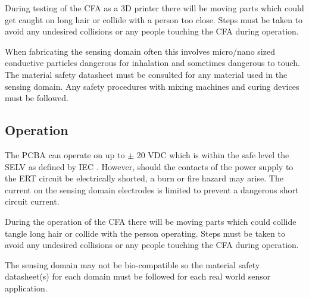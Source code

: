 During testing of the CFA as a 3D printer there will be moving parts which could get caught on long hair or collide with a person too close. Steps must be taken to avoid any undesired collisions or any people touching the CFA during operation.

When fabricating the sensing domain often this involves micro/nano sized conductive particles dangerous for inhalation and sometimes dangerous to touch. The material safety datasheet must be consulted for any material used in the sensing domain. Any safety procedures with mixing machines and curing devices must be followed.

\subsection{Operation}
The PCBA can operate on up to $\pm$ 20 VDC which is within the safe level the SELV as defined by IEC \cite{IEC2005}. However, should the contacts of the power supply to the ERT circuit be electrically shorted, a burn or fire hazard may arise. The current on the sensing domain electrodes is limited to prevent a dangerous short circuit current.

During the operation of the CFA there will be moving parts which could collide tangle long hair or collide with the person operating. Steps must be taken to avoid any undesired collisions or any people touching the CFA during operation.

The sensing domain may not be bio-compatible so the material safety datasheet(s) for each domain must be followed for each real world sensor application.


